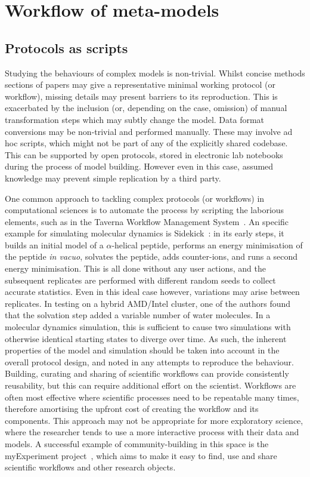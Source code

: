 \documentclass[conference]{IEEEtran}
\begin{document}
\section{Workflow of meta-models}

\subsection{Protocols as scripts}

Studying the behaviours of complex models is non-trivial. Whilst
concise methods sections of papers may give a representative minimal
working protocol (or workflow), missing details may present barriers
to its reproduction. This is exacerbated by the inclusion (or,
depending on the case, omission) of manual transformation steps which
may subtly change the model. Data format conversions may be
non-trivial and performed manually. These may involve ad hoc scripts,
which might not be part of any of the explicitly shared codebase. This
can be supported by open protocols, stored in electronic lab notebooks
during the process of model building. However even in this case,
assumed knowledge may prevent simple replication by a third party.

One common approach to tackling complex protocols (or workflows) in
computational sciences is to automate the process by scripting the
laborious elements, such as in the Taverna Workflow Management
System~\cite{taverna:2013}. An specific example for simulating
molecular dynamics is Sidekick~\cite{Hall2014Sidekick}: in its early
steps, it builds an initial model of a $\alpha$-helical peptide,
performs an energy minimisation of the peptide \emph{in vacuo},
solvates the peptide, adds counter-ions, and runs a second energy
minimisation. This is all done without any user actions, and the
subsequent replicates are performed with different random seeds to
collect accurate statistics. Even in this ideal case however,
variations may arise between replicates. In testing on a hybrid
AMD/Intel cluster, one of the authors found that the solvation step
added a variable number of water molecules. In a molecular dynamics
simulation, this is sufficient to cause two simulations with otherwise
identical starting states to diverge over time. As such, the inherent
properties of the model and simulation should be taken into account in
the overall protocol design, and noted in any attempts to reproduce
the behaviour. Building, curating and sharing of scientific workflows
can provide consistently reusability, but this can require additional
effort on the scientist.  Workflows are often most effective where
scientific processes need to be repeatable many times, therefore
amortising the upfront cost of creating the workflow and its
components. This approach may not be appropriate for more exploratory
science, where the researcher tends to use a more interactive process
with their data and models. A successful example of community-building
in this space is the myExperiment project~\cite{myexperiment:2009},
which aims to make it easy to find, use and share scientific workflows
and other research objects.
\end{document}
